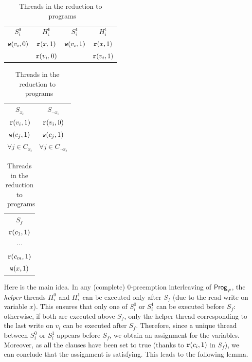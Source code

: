 \begin{table}[h]
    \caption{Threads in the reduction to \threewriter\ programs}
    \label{tab:reduction-threads-scmm}
    \noindent
    \begin{minipage}{0.38\textwidth}
    \centering
    \begin{tabular}{c | c | c | c}
        $S_i^0$ & $H_i^0$ & $S_i^1$ & $H_i^1$ \\
        $\mathtt{w}(v_i, 0)$ & $\mathtt{r}(x, 1)$ & $\mathtt{w}(v_i, 1)$ & $\mathtt{r}(x, 1)$ \\
        & $\mathtt{r}(v_i, 0)$ & & $\mathtt{r}(v_i, 1)$ 
    \end{tabular}
    \end{minipage}
    \hfill
    \begin{minipage}{0.32\textwidth}
    \centering
    \begin{tabular}{c | c }
        $S_{x_i}$ & $S_{\neg x_i}$ \\
        $\mathtt{r}(v_i, 1)$ & $\mathtt{r}(v_i, 0)$ \\
        $\mathtt{w}(c_j, 1)$ & $\mathtt{w}(c_j, 1)$ \\
        $\forall j \in C_{x_i}$ & $\forall j \in C_{\neg x_i}$ 
    \end{tabular}
    \end{minipage}
    \hfill
    \begin{minipage}{0.22\textwidth}
    \centering
    \begin{tabular}{c}
        $S_f$ \\
        $\mathtt{r}(c_1, 1)$ \\
        $\cdots$ \\
        $\mathtt{r}(c_m, 1)$ \\
        $\mathtt{w}(x, 1)$
    \end{tabular}
    \end{minipage}
\end{table}

Here is the main idea. In any (complete) $0$-preemption interleaving of $\mathsf{Prog}_\varphi$, the \emph{helper} threads $H_i^0$ and $H_i^1$ can be executed only after $S_f$ (due to the read-write on variable $x$). This ensures that only one of $S_i^0$ or $S_i^1$ can be executed before $S_f$: otherwise, if both are executed above $S_f$, only the helper thread corresponding to the last write on $v_i$ can be executed after $S_f$. Therefore, since a unique thread between $S_i^0$ or $S_i^1$ appears before $S_f$, we obtain an assignment for the variables. Moreover, as all the clauses have been set to true (thanks to $\mathtt{r}(c_i, 1)$ in $S_f$), we can conclude that the assignment is satisfying. This leads to the following lemma.

